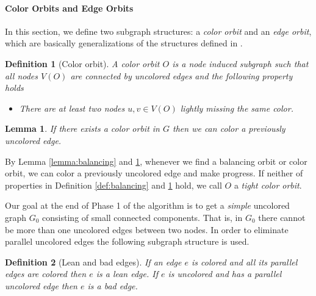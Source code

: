 \documentclass[titlepage, 11pt]{article}
\newtheorem{definition}{Definition}
\newtheorem{lemma}[theorem]{Lemma}
\begin{document}
\paragraph{Color Orbits and Edge Orbits}
In this section, we define two subgraph structures: a \emph{color orbit} and an \emph{edge orbit}, 
which are basically generalizations of the structures defined in \cite{sanders05}.

\begin{definition}[Color orbit]
\label{def:color}
A \emph{color orbit} $O$ is a node induced subgraph such that
all nodes $V(O)$ are connected by uncolored edges and the following property holds
\begin{itemize}
\item There are at least two nodes $u,v \in V(O)$ lightly missing the same color.
\end{itemize}

\end{definition}

\begin{lemma}\label{lemma:balancing2}
\cite{sanders05} If there exists a color orbit in $G$ then we can color a previously uncolored edge.
\end{lemma}

By Lemma \ref{lemma:balancing} and \ref{lemma:balancing2}, 
whenever we find a balancing orbit or color orbit, we can color a previously 
uncolored edge and make progress.
If neither of properties in Definition \ref{def:balancing} and \ref{def:color}
hold, we call $O$ a \emph{tight color orbit}.

\vspace{5pt}
Our goal at the end of Phase 1 of the algorithm is to get a \emph{simple} uncolored graph $G_0$ consisting of small connected components.
That is, in $G_0$ there cannot be more than one uncolored edges between two nodes. 
In order to eliminate parallel uncolored edges the following subgraph structure is used.

\begin{definition}[Lean and bad edges]
If an edge $e$ is colored and all its parallel edges are colored then $e$ is a \emph{lean} edge. 
If $e$ is uncolored and has a parallel uncolored edge then $e$ is a \emph{bad} edge.
\end{definition}
\end{document}
